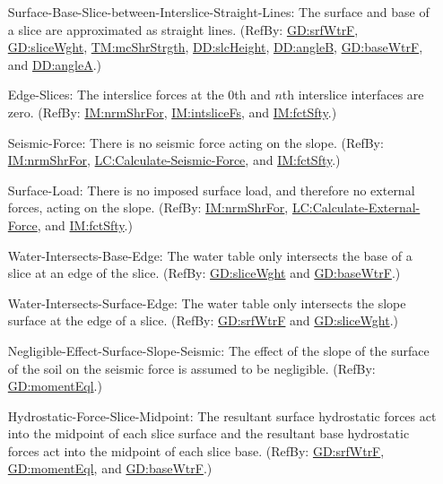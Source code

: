 \documentclass[12pt]{article}
\begin{document}
\begin{itemize}
\item[Surface-Base-Slice-between-Interslice-Straight-Lines:\phantomsection\label{assumpSBSBISL}]{The surface and base of a slice are approximated as straight lines. (RefBy: \hyperref[GD:srfWtrF]{GD:srfWtrF}, \hyperref[GD:sliceWght]{GD:sliceWght}, \hyperref[TM:mcShrStrgth]{TM:mcShrStrgth}, \hyperref[DD:slcHeight]{DD:slcHeight}, \hyperref[DD:angleB]{DD:angleB}, \hyperref[GD:baseWtrF]{GD:baseWtrF}, and \hyperref[DD:angleA]{DD:angleA}.)}
\item[Edge-Slices:\phantomsection\label{assumpES}]{The interslice forces at the 0th and $n$th interslice interfaces are zero. (RefBy: \hyperref[IM:nrmShrFor]{IM:nrmShrFor}, \hyperref[IM:intsliceFs]{IM:intsliceFs}, and \hyperref[IM:fctSfty]{IM:fctSfty}.)}
\item[Seismic-Force:\phantomsection\label{assumpSF}]{There is no seismic force acting on the slope. (RefBy: \hyperref[IM:nrmShrFor]{IM:nrmShrFor}, \hyperref[LC_seismic]{LC:Calculate-Seismic-Force}, and \hyperref[IM:fctSfty]{IM:fctSfty}.)}
\item[Surface-Load:\phantomsection\label{assumpSL}]{There is no imposed surface load, and therefore no external forces, acting on the slope. (RefBy: \hyperref[IM:nrmShrFor]{IM:nrmShrFor}, \hyperref[LC_external]{LC:Calculate-External-Force}, and \hyperref[IM:fctSfty]{IM:fctSfty}.)}
\item[Water-Intersects-Base-Edge:\phantomsection\label{assumpWIBE}]{The water table only intersects the base of a slice at an edge of the slice. (RefBy: \hyperref[GD:sliceWght]{GD:sliceWght} and \hyperref[GD:baseWtrF]{GD:baseWtrF}.)}
\item[Water-Intersects-Surface-Edge:\phantomsection\label{assumpWISE}]{The water table only intersects the slope surface at the edge of a slice. (RefBy: \hyperref[GD:srfWtrF]{GD:srfWtrF} and \hyperref[GD:sliceWght]{GD:sliceWght}.)}
\item[Negligible-Effect-Surface-Slope-Seismic:\phantomsection\label{assumpNESSS}]{The effect of the slope of the surface of the soil on the seismic force is assumed to be negligible. (RefBy: \hyperref[GD:momentEql]{GD:momentEql}.)}
\item[Hydrostatic-Force-Slice-Midpoint:\phantomsection\label{assumpHFSM}]{The resultant surface hydrostatic forces act into the midpoint of each slice surface and the resultant base hydrostatic forces act into the midpoint of each slice base. (RefBy: \hyperref[GD:srfWtrF]{GD:srfWtrF}, \hyperref[GD:momentEql]{GD:momentEql}, and \hyperref[GD:baseWtrF]{GD:baseWtrF}.)}
\end{itemize}
\end{document}
